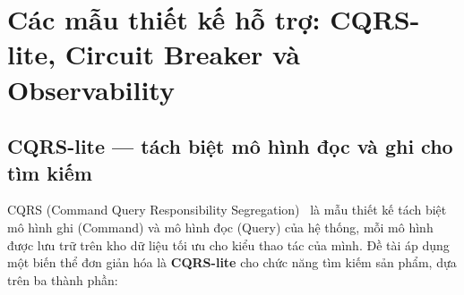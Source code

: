 \documentclass[../DoAn.tex]{subfiles}
\begin{document}



\section{Các mẫu thiết kế hỗ trợ: CQRS-lite, Circuit Breaker và Observability}
\label{section:2.7}

\subsection{CQRS-lite --- tách biệt mô hình đọc và ghi cho tìm kiếm}

CQRS (Command Query Responsibility Segregation)~\cite{fowler2011cqrs} là mẫu thiết kế tách
biệt mô hình ghi (Command) và mô hình đọc (Query) của hệ thống, mỗi mô hình được lưu trữ
trên kho dữ liệu tối ưu cho kiểu thao tác của mình. Đề tài áp dụng một biến thể đơn giản hóa
là \textbf{CQRS-lite} cho chức năng tìm kiếm sản phẩm, dựa trên ba thành phần:
\end{document}
